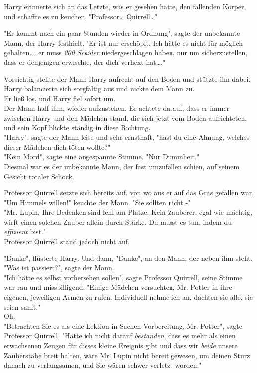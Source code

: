 {Harry erinnerte sich an das Letzte, was er gesehen hatte, den fallenden Körper, und schaffte es zu keuchen, "Professor… Quirrell…"

"Er kommt nach ein paar Stunden wieder in Ordnung", sagte der unbekannte Mann, der Harry festhielt. "Er ist nur erschöpft. Ich hätte es nicht für möglich gehalten…. er muss \emph{200 Schüler} niedergeschlagen haben, nur um sicherzustellen, dass er denjenigen erwischte, der dich verhext hat…."

Vorsichtig stellte der Mann Harry aufrecht auf den Boden und stützte ihn dabei.\\ Harry balancierte sich sorgfältig aus und nickte dem Mann zu.\\ Er ließ los, und Harry fiel sofort um.\\ Der Mann half ihm, wieder aufzustehen. Er achtete darauf, dass er immer zwischen Harry und den Mädchen stand, die sich jetzt vom Boden aufrichteten, und sein Kopf blickte ständig in diese Richtung.\\ "Harry", sagte der Mann leise und sehr ernsthaft, "hast du eine Ahnung, welches dieser Mädchen dich töten wollte?"\\ "Kein Mord", sagte eine angespannte Stimme. "Nur Dummheit."\\ Diesmal war es der unbekannte Mann, der fast umzufallen schien, auf seinem Gesicht totaler Schock.

Professor Quirrell setzte sich bereits auf, von wo aus er auf das Gras gefallen war.\\ "Um Himmels willen!" keuchte der Mann. "Sie sollten nicht -"\\ "Mr. Lupin, Ihre Bedenken sind fehl am Platze. Kein Zauberer, egal wie mächtig, wirft einen solchen Zauber allein durch Stärke. Du musst es tun, indem du \emph{effizient} bist."\\ Professor Quirrell stand jedoch nicht auf.

"Danke", flüsterte Harry. Und dann, "Danke", an den Mann, der neben ihm steht.\\ "Was ist passiert?", sagte der Mann.\\ "Ich hätte es selbst vorhersehen sollen", sagte Professor Quirrell, seine Stimme war rau und missbilligend. "Einige Mädchen versuchten, Mr. Potter in ihre eigenen, jeweiligen Armen zu rufen. Individuell nehme ich an, dachten sie alle, sie seien sanft."\\ Oh.\\ "Betrachten Sie es als eine Lektion in Sachen Vorbereitung, Mr. Potter", sagte Professor Quirrell. "Hätte ich nicht darauf \emph{bestanden}, dass es mehr als einen erwachsenen Zeugen für dieses kleine Ereignis gibt und dass wir \emph{beide} unsere Zauberstäbe breit halten, wäre Mr. Lupin nicht bereit gewesen, um deinen Sturz danach zu verlangsamen, und Sie wären schwer verletzt worden."

}
